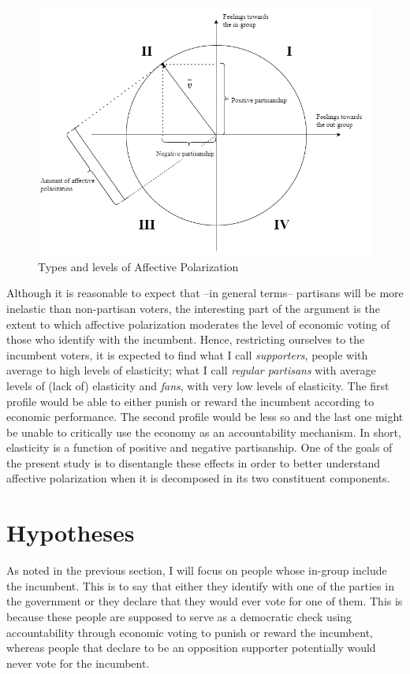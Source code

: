 \documentclass[a4paper, svgnames]{article}
\begin{document}
\begin{figure}[H]
	\centering
	\includegraphics[scale=0.70]{Figures/API-theory.png}
	\caption{Types and levels of Affective Polarization}
	\label{fig:types_and_levels_of_AP}
\end{figure}

Although it is reasonable to expect that --in general terms-- partisans will be more inelastic than non-partisan voters, the interesting part of the argument is the extent to which affective polarization moderates the level of economic voting of those who identify with the incumbent. Hence, restricting ourselves to the incumbent voters, it is expected to find what I call \textit{supporters}, people with average to high levels of elasticity; what I call \textit{regular partisans} with average levels of (lack of) elasticity and \textit{fans}, with very low levels of elasticity. The first profile would be able to either punish or reward the incumbent according to economic performance. The second profile would be less so and the last one might be unable to critically use the economy as an accountability mechanism. In short, elasticity is a function of positive and negative partisanship. One of the goals of the present study is to disentangle these effects in order to better understand affective polarization when it is decomposed in its two constituent components.


\section{Hypotheses}

As noted in the previous section, I will focus on people whose in-group include the incumbent. This is to say that either they identify with one of the parties in the government or they declare that they would ever vote for one of them. This is because these people are supposed to serve as a democratic check using accountability through economic voting to punish or reward the incumbent, whereas people that declare to be an opposition supporter potentially would never vote for the incumbent.
\end{document}
